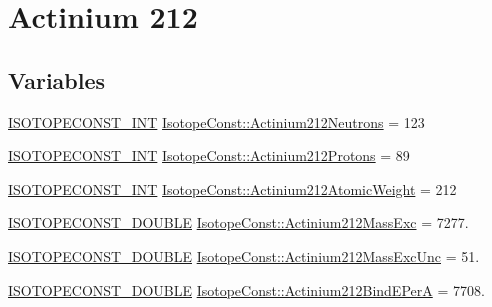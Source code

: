 \hypertarget{group___isotope_const-_actinium-_ac212}{}\section{Actinium 212}
\label{group___isotope_const-_actinium-_ac212}
\subsection*{Variables}
\begin{DoxyCompactItemize}
\item 
\mbox{\hyperlink{group___isotope_const-_macros_ga5f18360b3e99483a35c32d789e62621c}{I\+S\+O\+T\+O\+P\+E\+C\+O\+N\+S\+T\+\_\+\+I\+NT}} \mbox{\hyperlink{group___isotope_const-_actinium-_ac212_ga8b5872df7e602bc41e21177f0e02a088}{Isotope\+Const\+::\+Actinium212\+Neutrons}} = 123
\item 
\mbox{\hyperlink{group___isotope_const-_macros_ga5f18360b3e99483a35c32d789e62621c}{I\+S\+O\+T\+O\+P\+E\+C\+O\+N\+S\+T\+\_\+\+I\+NT}} \mbox{\hyperlink{group___isotope_const-_actinium-_ac212_gae5fa46b920240180e80dbc37954bcc3e}{Isotope\+Const\+::\+Actinium212\+Protons}} = 89
\item 
\mbox{\hyperlink{group___isotope_const-_macros_ga5f18360b3e99483a35c32d789e62621c}{I\+S\+O\+T\+O\+P\+E\+C\+O\+N\+S\+T\+\_\+\+I\+NT}} \mbox{\hyperlink{group___isotope_const-_actinium-_ac212_ga0ee2320dfc0d9dd3e02677d431d513bf}{Isotope\+Const\+::\+Actinium212\+Atomic\+Weight}} = 212
\item 
\mbox{\hyperlink{group___isotope_const-_macros_ga8f45a7272ce02c0b4c65c44636ed719a}{I\+S\+O\+T\+O\+P\+E\+C\+O\+N\+S\+T\+\_\+\+D\+O\+U\+B\+LE}} \mbox{\hyperlink{group___isotope_const-_actinium-_ac212_gabdf39f0050cf8f3e949b2cc17bc176ce}{Isotope\+Const\+::\+Actinium212\+Mass\+Exc}} = 7277.
\item 
\mbox{\hyperlink{group___isotope_const-_macros_ga8f45a7272ce02c0b4c65c44636ed719a}{I\+S\+O\+T\+O\+P\+E\+C\+O\+N\+S\+T\+\_\+\+D\+O\+U\+B\+LE}} \mbox{\hyperlink{group___isotope_const-_actinium-_ac212_ga29416bcd2590360ddf8b22a4c3b97524}{Isotope\+Const\+::\+Actinium212\+Mass\+Exc\+Unc}} = 51.
\item 
\mbox{\hyperlink{group___isotope_const-_macros_ga8f45a7272ce02c0b4c65c44636ed719a}{I\+S\+O\+T\+O\+P\+E\+C\+O\+N\+S\+T\+\_\+\+D\+O\+U\+B\+LE}} \mbox{\hyperlink{group___isotope_const-_actinium-_ac212_ga9c85d8b0eac3c6a2cd66dd4461e3513d}{Isotope\+Const\+::\+Actinium212\+Bind\+E\+PerA}} = 7708.
\item 

\end{DoxyCompactItemize}
